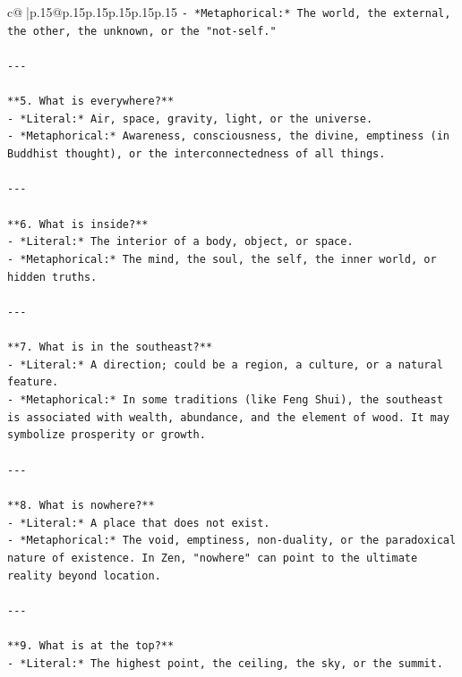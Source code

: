 \documentclass{article}
\begin{document}
{\begin{supertabular}{c@{$\;$}|p{.15\linewidth}@{}p{.15\linewidth}p{.15\linewidth}p{.15\linewidth}p{.15\linewidth}p{.15\linewidth}}
{{{\texttt{{-} *Metaphorical:* The world, the external, the other, the unknown, or the "not{-}self."} \\
\\ 
\texttt{{-}{-}{-}} \\
\\ 
\texttt{**5. What is everywhere?**  } \\
\texttt{{-} *Literal:* Air, space, gravity, light, or the universe.  } \\
\texttt{{-} *Metaphorical:* Awareness, consciousness, the divine, emptiness (in Buddhist thought), or the interconnectedness of all things.} \\
\\ 
\texttt{{-}{-}{-}} \\
\\ 
\texttt{**6. What is inside?**  } \\
\texttt{{-} *Literal:* The interior of a body, object, or space.  } \\
\texttt{{-} *Metaphorical:* The mind, the soul, the self, the inner world, or hidden truths.} \\
\\ 
\texttt{{-}{-}{-}} \\
\\ 
\texttt{**7. What is in the southeast?**  } \\
\texttt{{-} *Literal:* A direction; could be a region, a culture, or a natural feature.  } \\
\texttt{{-} *Metaphorical:* In some traditions (like Feng Shui), the southeast is associated with wealth, abundance, and the element of wood. It may symbolize prosperity or growth.} \\
\\ 
\texttt{{-}{-}{-}} \\
\\ 
\texttt{**8. What is nowhere?**  } \\
\texttt{{-} *Literal:* A place that does not exist.  } \\
\texttt{{-} *Metaphorical:* The void, emptiness, non{-}duality, or the paradoxical nature of existence. In Zen, "nowhere" can point to the ultimate reality beyond location.} \\
\\ 
\texttt{{-}{-}{-}} \\
\\ 
\texttt{**9. What is at the top?**  } \\
\texttt{{-} *Literal:* The highest point, the ceiling, the sky, or the summit.  } \\
}}}
\end{supertabular}}
\end{document}
